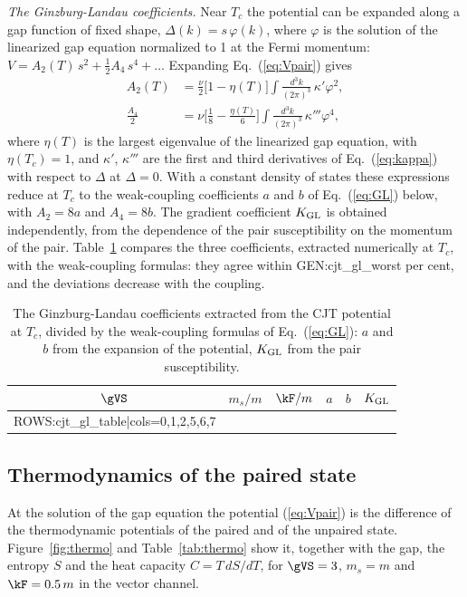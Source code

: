 \emph{The Ginzburg-Landau coefficients.} Near $T_c$ the potential can be expanded along a gap function
of fixed shape, $\Delta(k)=s\,\varphi(k)$, where $\varphi$ is the solution of the linearized gap
equation normalized to 1 at the Fermi momentum: $V=A_2(T)\,s^2+\tfrac12A_4\,s^4+\dots$ Expanding
Eq.~(\ref{eq:Vpair}) gives
\begin{align}
A_2(T)&=\frac\nu2\big[1-\eta(T)\big]\!\int\!\!\frac{d^3k}{(2\pi)^3}\,\kappa'\varphi^2,\nonumber\\
\frac{A_4}2&=\nu\Big[\frac18-\frac{\eta(T)}{6}\Big]\!\int\!\!\frac{d^3k}{(2\pi)^3}\,\kappa'''\varphi^4,
\label{eq:GLcjt}
\end{align}
where $\eta(T)$ is the largest eigenvalue of the linearized gap equation, with $\eta(T_c)=1$, and
$\kappa'$, $\kappa'''$ are the first and third derivatives of Eq.~(\ref{eq:kappa}) with respect to
$\Delta$ at $\Delta=0$. With a constant density of states these expressions reduce at $T_c$ to the
weak-coupling coefficients $a$ and $b$ of Eq.~(\ref{eq:GL}) below, with $A_2=8a$ and
$A_4=8b$. The gradient coefficient $K_{\rm GL}$ is obtained independently, from the dependence of the pair
susceptibility on the momentum of the pair. Table~\ref{tab:gl} compares the three coefficients,
extracted numerically at $T_c$, with the weak-coupling formulas: they agree within
{{GEN:cjt_gl_worst}} per cent, and the deviations decrease with the coupling.

\begin{table}
\caption{\label{tab:gl}The Ginzburg-Landau coefficients extracted from the CJT potential at $T_c$,
divided by the weak-coupling formulas of Eq.~(\ref{eq:GL}): $a$ and $b$ from the expansion of the
potential, $K_{\rm GL}$ from the pair susceptibility.}
\begin{ruledtabular}
\begin{tabular}{cccccc}
$\gVS$ & $m_s/m$ & $\kF/m$ & $a$ & $b$ & $K_{\rm GL}$ \\
\hline
{{ROWS:cjt_gl_table|cols=0,1,2,5,6,7}}
\end{tabular}
\end{ruledtabular}
\end{table}

\subsection{Thermodynamics of the paired state}
\label{sec:thermo}

At the solution of the gap equation the potential (\ref{eq:Vpair}) is the difference of the
thermodynamic potentials of the paired and of the unpaired state. Figure~\ref{fig:thermo} and
Table~\ref{tab:thermo} show it, together with the gap, the entropy $S$ and the heat capacity
$C=T\,dS/dT$, for $\gVS=3$, $m_s=m$ and $\kF=0.5\,m$ in the vector channel.

